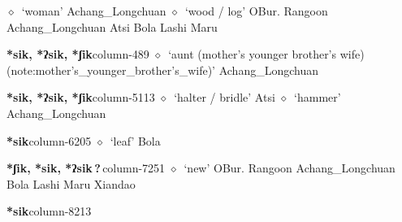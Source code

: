 \hspace{1ex}
         $\diamond$~`woman'
         Achang\_Longchuan 
\hspace{1ex}
         $\diamond$~`wood / log'
         OBur. 
\hspace{1ex}
         Rangoon 
\hspace{1ex}
         Achang\_Longchuan 
\hspace{1ex}
         Atsi 
\hspace{1ex}
         Bola 
\hspace{1ex}
         Lashi 
\hspace{1ex}
         Maru 
  \item {\footnotesize \textbf{*sik, *ʔsik, *ʃik}}{\tiny column-489}
         $\diamond$~`aunt (mother's younger brother's wife) (note:mother's_younger_brother's_wife)'
         Achang\_Longchuan 
  \item {\footnotesize \textbf{*sik, *ʔsik, *ʃik}}{\tiny column-5113}
         $\diamond$~`halter / bridle'
         Atsi 
\hspace{1ex}
         $\diamond$~`hammer'
         Achang\_Longchuan 
  \item {\footnotesize \textbf{*sik}}{\tiny column-6205}
         $\diamond$~`leaf'
         Bola 
  \item {\footnotesize \textbf{*ʃik, *sik, *ʔsik\,?\,}}{\tiny column-7251}
         $\diamond$~`new'
         OBur. 
\hspace{1ex}
         Rangoon 
\hspace{1ex}
         Achang\_Longchuan 
\hspace{1ex}
         Bola 
\hspace{1ex}
         Lashi 
\hspace{1ex}
         Maru 
\hspace{1ex}
         Xiandao 
  \item {\footnotesize \textbf{*sik}}{\tiny column-8213}
